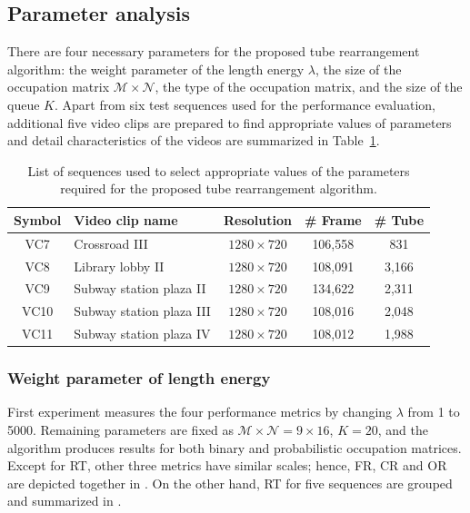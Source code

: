 \documentclass[11pt]{hyu_thesis}
\begin{document}
\subsection{Parameter analysis}
\label{sec:exp:param}
There are four necessary parameters for the proposed tube rearrangement algorithm: the weight parameter of the length energy $\lambda$, the size of the occupation matrix $\mathcal{M}\times\mathcal{N}$, the type of the occupation matrix, and the size of the queue $K$. Apart from six test sequences used for the performance evaluation, additional five video clips are prepared to find appropriate values of parameters and detail characteristics of the videos are summarized in Table~\ref{tb:video_param}.
\begin{table}
	\begin{center}
		\begin{tabular}{clccc}
			\hline
			\hline
			Symbol & Video clip name & Resolution & \# Frame & \# Tube\\
			\hline
			\hline
			VC7 & Crossroad III & $1280 \times 720$ & 106,558 & 831 \\
			\hline
			VC8 & Library lobby II & $1280 \times 720$ & 108,091 & 3,166 \\
			\hline
			VC9 & Subway station plaza II & $1280 \times 720$ & 134,622 & 2,311 \\
			\hline
			VC10 & Subway station plaza III & $1280 \times 720$ & 108,016 & 2,048 \\
			\hline
			VC11 & Subway station plaza IV & $1280 \times 720$ & 108,012 & 1,988 \\
			\hline
		\end{tabular}
	\end{center}
	\caption{List of sequences used to select appropriate values of the parameters required for the proposed tube rearrangement algorithm.}
	\label{tb:video_param}
\end{table}

\subsubsection{Weight parameter of length energy}
\label{sec:exp:weight}
First experiment measures the four performance metrics by changing $\lambda$ from 1 to 5000. Remaining parameters are fixed as $\mathcal{M}\times\mathcal{N}=9\times16$, $K=20$, and the algorithm produces results for both binary and probabilistic occupation matrices. Except for RT, other three metrics have similar scales; hence, FR, CR and OR are depicted together in . On the other hand, RT for five sequences are grouped and summarized in . 
\end{document}
